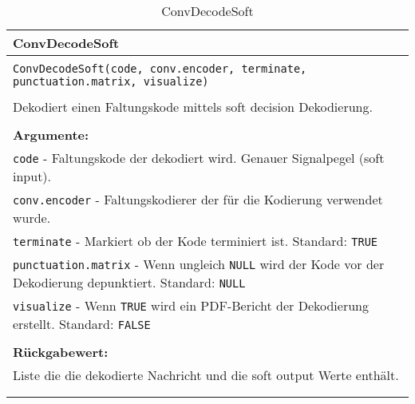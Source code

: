 \begin{longtable}{|p{\textwidth}|}
\hline
\rowcolor{lightblue}
ConvDecodeSoft
\\
\hline
\\
\texttt{ConvDecodeSoft(code, conv.encoder, terminate, punctuation.matrix, visualize)}\\
\\
Dekodiert einen Faltungskode mittels soft decision Dekodierung.\\
\\
\textbf{Argumente:}\\
\texttt{code} - Faltungskode der dekodiert wird. Genauer Signalpegel (soft input).\\
\texttt{conv.encoder} - Faltungskodierer der für die Kodierung verwendet wurde.\\
\texttt{terminate} - Markiert ob der Kode terminiert ist. Standard: \texttt{TRUE}\\
\texttt{punctuation.matrix} - Wenn ungleich \texttt{NULL} wird der Kode vor der Dekodierung depunktiert. Standard: \texttt{NULL}\\
\texttt{visualize} - Wenn \texttt{TRUE} wird ein PDF-Bericht der Dekodierung erstellt. Standard: \texttt{FALSE}\\
\\
\textbf{Rückgabewert:}\\
Liste die die dekodierte Nachricht und die soft output Werte enthält.\\
\\
\hline
\caption{ConvDecodeSoft}
\end{longtable}